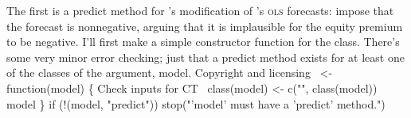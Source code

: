 \documentclass[10pt]{article}%
\newcommand\citepos[2][]{\citeauthor{#2}'s \citeyearpar[#1]{#2}}
\begin{document}
The first is a {\Tt{}predict\nwendquote} method for \citepos{CaT:08} modification of
\citepos{GoW:08} \textsc{ols} forecasts: \citet{CaT:08} impose that
the forecast is nonnegative, arguing that it is implausible for the
equity premium to be negative.  I'll first make a simple constructor
function for the {\Tt{}\nwendquote} class.  There's some very minor error
checking; just that a {\Tt{}predict\nwendquote} method exists for at least one of
the classes of the argument, {\Tt{}model\nwendquote}.
\nwenddocs{}\endmoddef\nwstartdeflinemarkup{}\nwenddeflinemarkup
\LA{}Copyright and licensing~{\nwtagstyle{}}\RA{}
 <- function(model) \{
  \LA{}Check inputs for \code{}CT\edoc{}~{\nwtagstyle{}}\RA{}
  class(model) <- c("", class(model))
  model
\}
\eatline
{}\nwendcode{}\nwdocspar
\nwenddocs{}\endmoddef\nwstartdeflinemarkup{}\nwenddeflinemarkup
  if (!(model, "predict"))
    stop("'model' must have a 'predict' method.")
\nwendcode{}\nwdocspar
\end{document}
